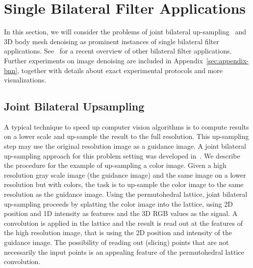 \section{Single Bilateral Filter Applications}\label{sec:filtering}

In this section, we will consider the problems of joint bilateral up-sampling~\cite{kopf2007joint}
and 3D body mesh denoising as prominent instances of single bilateral filter applications.
See~\cite{paris2009bilateral} for a recent overview of other bilateral filter applications.
Further experiments on image denoising are included in Appendix~\ref{sec:appendix-bnn},
together with details about exact experimental protocols and more visualizations.

\subsection{Joint Bilateral Upsampling}

A typical technique to speed up computer vision algorithms is to compute results on a
lower scale and up-sample the result to the full resolution. This up-sampling
step may use the original resolution image as a guidance image. A joint bilateral up-sampling approach
for this problem setting was developed in~\cite{kopf2007joint}. We describe the procedure
for the example of up-sampling a color image. Given a high resolution gray scale image (the guidance image) and
the same image on a lower resolution but with colors, the task is to up-sample the color image to the
same resolution as the guidance image. Using the permutohedral lattice, joint bilateral up-sampling proceeds by
splatting the color image into the lattice, using 2D position and 1D intensity as features and the 3D RGB values
as the signal. A convolution is applied in the lattice and the result is read out at the features of the high
resolution image, that is using the 2D position and intensity of the guidance image. The possibility of
reading out (slicing) points that are not necessarily the input points is an appealing feature of the permutohedral lattice
convolution.

